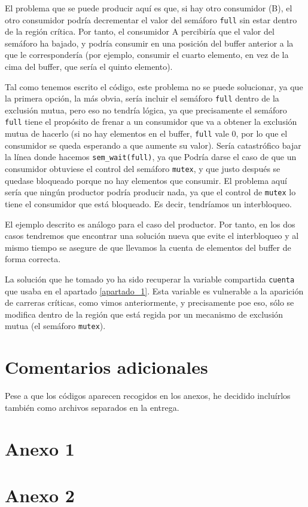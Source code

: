 \documentclass[a4paper]{article}
\begin{document}
El problema que se puede producir aquí es que, si hay otro consumidor (B), el otro consumidor podría decrementar el valor del semáforo \texttt{full} sin estar dentro de la región crítica. Por tanto, el consumidor A percibiría que el valor del semáforo ha bajado, y podría consumir en una posición del buffer anterior a la que le correspondería (por ejemplo, consumir el cuarto elemento, en vez de la cima del buffer, que sería el quinto elemento).

Tal como tenemos escrito el código, este problema no se puede solucionar, ya que la primera opción, la más obvia, sería incluir el semáforo \texttt{full} dentro de la exclusión mutua, pero eso no tendría lógica, ya que precisamente el semáforo \texttt{full} tiene el propósito de frenar a un consumidor que va a obtener la exclusión mutua de hacerlo (si no hay elementos en el buffer, \texttt{full} vale 0, por lo que el consumidor se queda esperando a que aumente su valor). Sería catastrófico bajar la línea donde hacemos \texttt{sem\_wait(full)}, ya que Podría darse el caso de que un consumidor obtuviese el control del semáforo \texttt{mutex}, y que justo después se quedase bloqueado porque no hay elementos que consumir. El problema aquí sería que ningún productor podría producir nada, ya que el control de \texttt{mutex} lo tiene el consumidor que está bloqueado. Es decir, tendríamos un interbloqueo.

El ejemplo descrito es análogo para el caso del productor. Por tanto, en los dos casos tendremos que encontrar una solución nueva que evite el interbloqueo y al mismo tiempo se asegure de que llevamos la cuenta de elementos del buffer de forma correcta.

La solución que he tomado yo ha sido recuperar la variable compartida \texttt{cuenta} que usaba en el apartado \ref{apartado_1}. Esta variable es vulnerable a la aparición de carreras críticas, como vimos anteriormente, y precisamente poe eso, sólo se modifica dentro de la región que está regida por un mecanismo de exclusión mutua (el semáforo \texttt{mutex}).

\section{Comentarios adicionales}

Pese a que los códigos aparecen recogidos en los anexos, he decidido incluírlos también como archivos separados en la entrega.
    
\begin{appendices} 
\section{\LARGE \textbf{Anexo 1}}\label{anexo1}

    
\section{\LARGE \textbf{Anexo 2}}\label{anexo2}

    
\end{appendices}
\end{document}
